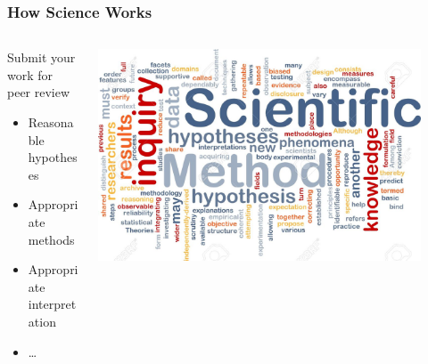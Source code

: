 \documentclass[10pt]{beamer}
\begin{document}
\begin{frame}[t]
\frametitle{How Science Works}
\vspace{0.5cm}

	\begin{columns}
		\begin{column}{0.6\textwidth}
			Submit your work for peer review\\
			\medskip
				\begin{itemize}
					\item Reasonable hypotheses
					\smallskip
					\item Appropriate methods
					\smallskip
					\item Appropriate interpretation
					\smallskip
					\item \ldots
				\end{itemize}
		\end{column}
		
		\begin{column}{0.4\textwidth}
			\begin{center}
				\includegraphics[width=0.9\textwidth]{figures/science3.jpg}
			\end{center}
		\end{column}
	\end{columns}
\end{frame}
\end{document}
